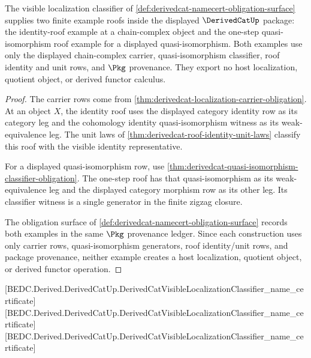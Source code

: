 \begin{theorem}
\label{thm:derivedcat-localization-example-boundary}
The visible localization classifier of
\autoref{def:derivedcat-namecert-obligation-surface} supplies two finite
example roofs inside the displayed $\DerivedCatUp$ package: the identity-roof
example at a chain-complex object and the one-step quasi-isomorphism roof
example for a displayed quasi-isomorphism. Both examples use only the displayed
chain-complex carrier, quasi-isomorphism classifier, roof identity and unit
rows, and $\Pkg$ provenance. They export no host localization, quotient object,
or derived functor calculus.
\end{theorem}
\begin{proof}
The carrier rows come from
\autoref{thm:derivedcat-localization-carrier-obligation}. At an object $X$, the
identity roof uses the displayed category identity row as its category leg and
the cohomology identity quasi-isomorphism witness as its weak-equivalence leg.
The unit laws of
\autoref{thm:derivedcat-roof-identity-unit-laws} classify this roof with the
visible identity representative.

For a displayed quasi-isomorphism row, use
\autoref{thm:derivedcat-quasi-isomorphism-classifier-obligation}. The
one-step roof has that quasi-isomorphism as its weak-equivalence leg and the
displayed category morphism row as its other leg. Its classifier witness is a
single generator in the finite zigzag closure.

The obligation surface of
\autoref{def:derivedcat-namecert-obligation-surface} records both examples in
the same $\Pkg$ provenance ledger. Since each construction uses only carrier
rows, quasi-isomorphism generators, roof identity/unit rows, and package
provenance, neither example creates a host localization, quotient object, or
derived functor operation.
\end{proof}

[BEDC.Derived.DerivedCatUp.DerivedCatVisibleLocalizationClassifier\_name\_certificate]
[BEDC.Derived.DerivedCatUp.DerivedCatVisibleLocalizationClassifier\_name\_certificate]
[BEDC.Derived.DerivedCatUp.DerivedCatVisibleLocalizationClassifier\_name\_certificate]

